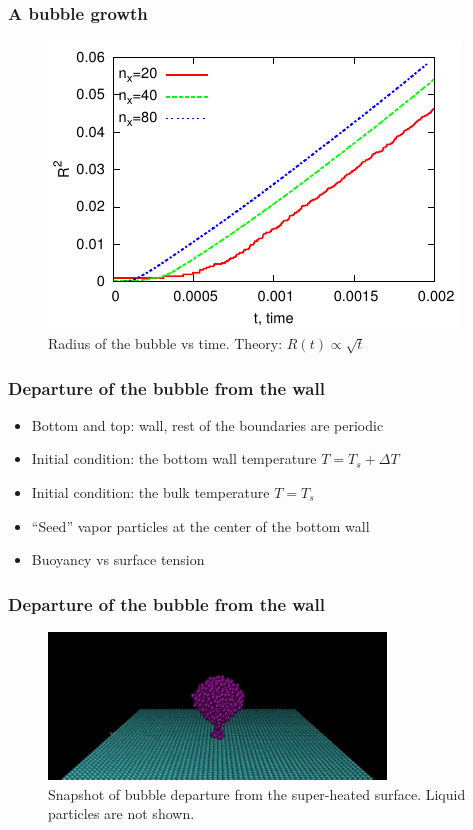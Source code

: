 \documentclass{beamer}
\begin{document}
\begin{frame}
  \frametitle{A bubble growth}
  \begin{figure}[ht]
    \centering
    \includegraphics{gnuplot/f1.pdf}
    \caption{Radius of the bubble vs time. Theory: $R(t) \propto \sqrt{t}$}
    \label{fig:dep}
  \end{figure}
\end{frame}

\begin{frame}
  \frametitle{Departure of the bubble from the wall}
  \begin{itemize}
  \item Bottom and top: wall, rest of the boundaries are periodic
  \item Initial condition: the bottom wall temperature $T=T_s + \Delta T$
  \item Initial condition: the bulk temperature $T=T_s$
  \item ``Seed'' vapor particles at the center of the bottom wall
  \item Buoyancy vs surface tension
  \end{itemize}
\end{frame}

\begin{frame}
  \frametitle{Departure of the bubble from the wall}
  \begin{figure}[ht]
    \centering
    \includegraphics[width=0.8\textwidth]{gnuplot/dep-59.pdf}
    \caption{Snapshot of bubble departure from the super-heated
      surface. Liquid particles are not shown.}
    \label{fig:snapshot}
  \end{figure}
\end{frame}
\end{document}
